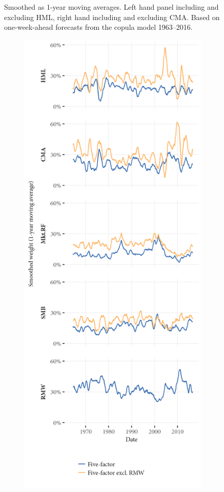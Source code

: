 \begin{figure}[htbp]
  \begin{longcaption}
    Smoothed as 1-year moving averages. Left hand panel including and excluding HML, right hand including and excluding CMA. Based on one-week-ahead forecasts from the copula model 1963--2016.
  \end{longcaption}
\end{figure}

\begin{figure}[htbp]
  \ContinuedFloat
  \centering
  \begin{subfigure}{0.45\textwidth}
    \includegraphics[width=\textwidth]{graphics/weights/appendix_Weights_CDB_5F_5F_EXCL_RMW.png}  

\end{subfigure}
\end{figure}
